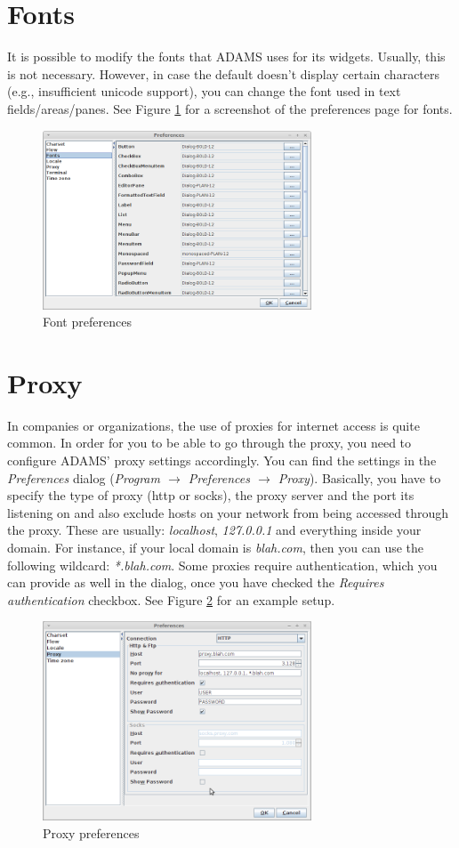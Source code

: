 \section{Fonts}
It is possible to modify the fonts that ADAMS uses for its widgets. Usually,
this is not necessary. However, in case the default doesn't display certain
characters (e.g., insufficient unicode support), you can change the font
used in text fields/areas/panes. See Figure \ref{fonts_setup} for a screenshot
of the preferences page for fonts.

\begin{figure}[htb]
  \centering
  \includegraphics[width=8.0cm]{images/fonts_setup.png}
  \caption{Font preferences}
  \label{fonts_setup}
\end{figure}

\section{Proxy}
In companies or organizations, the use of proxies for internet access is quite
common. In order for you to be able to go through the proxy, you need to 
configure ADAMS' proxy settings accordingly. You can find the settings in the
\textit{Preferences} dialog (\textit{Program $\rightarrow$ Preferences $\rightarrow$ Proxy}).
Basically, you have to specify the type of proxy (http or socks), the proxy server 
and the port its listening on and also exclude hosts on your network from being 
accessed through the proxy. These are usually: \textit{localhost}, \textit{127.0.0.1} 
and everything inside your domain. For instance, if your local domain is 
\textit{blah.com}, then you can use the following wildcard: \textit{*.blah.com}. 
Some proxies require authentication, which you can provide as well in the dialog,
once you have checked the \textit{Requires authentication} checkbox.
See Figure \ref{proxy_setup} for an example setup.

\begin{figure}[htb]
  \centering
  \includegraphics[width=8.0cm]{images/proxy_setup.png}
  \caption{Proxy preferences}
  \label{proxy_setup}
\end{figure}


